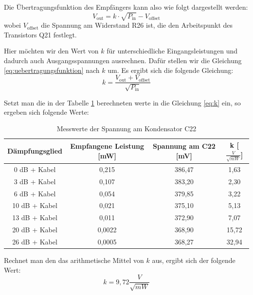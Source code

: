 Die Übertragungsfunktion des Empfängers kann also wie folgt dargestellt werden:
\begin{equation}
    V_\text{out} = k \cdot \sqrt{P_\text{in}} - V_\text{offset}
    \label{eq:uebertragungsfunktion}
\end{equation}
wobei \( V_\text{offset} \) die Spannung am Widerstand R26 ist, die den Arbeitspunkt des Transistors Q21 festlegt. 

Hier möchten wir den Wert von $k$ für unterschiedliche Eingangsleistungen und dadurch auch Ausgangsspannungen ausrechnen. Dafür stellen wir die Gleichung \ref{eq:uebertragungsfunktion} nach $k$ um. Es ergibt sich die folgende Gleichung:
\begin{equation}
    k = \frac{V_\text{out} + V_\text{offset}}{\sqrt{P_\text{in}}}
    \label{eq:k}
\end{equation}



Setzt man die in der Tabelle \ref{tab:spannung} berechneten werte in die Gleichung \ref{eq:k} ein, so ergeben sich folgende Werte:

\begin{table}[H]
    \centering
    \begin{tabular}{|c|c|c|c|}
        \hline
        Dämpfungsglied  & Empfangene Leistung [mW] & Spannung am C22 [mV] & k [$\frac{V}{\sqrt{mW}}$] \\ \hline
        0 dB + Kabel   & 0,215 & 386,47 & 1,63\\ \hline
        3 dB + Kabel   & 0,107 & 383,20 & 2,30\\ \hline
        6 dB + Kabel   & 0,054 & 379,85 & 3,22\\ \hline
        10 dB + Kabel  & 0,021 & 375,10 & 5,13\\ \hline
        13 dB + Kabel  & 0,011 & 372,90 & 7,07\\ \hline
        20 dB + Kabel  & 0,0022 & 368,90 & 15,72\\ \hline
        26 dB + Kabel  & 0,0005 & 368,27 & 32,94\\ \hline
    \end{tabular}
    \caption{Messwerte der Spannung am Kondensator C22}
    \label{tab:spannung}
\end{table}

Rechnet man den das arithmetische Mittel von $k$ aus, ergibt sich der folgende Wert:
\begin{equation}
    k = 9,72 \frac{V}{\sqrt{mW}}
\end{equation}

